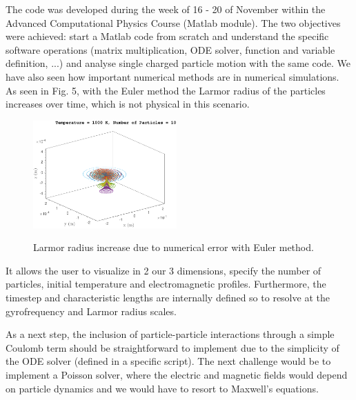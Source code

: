 The code was developed during the week of 16 - 20 of November within the Advanced Computational Physics Course (Matlab module). The two objectives were achieved: start a Matlab code from scratch and understand the specific software operations (matrix multiplication, ODE solver, function and variable definition, ...) and analyse single charged particle motion with the same code. We have also seen how important numerical methods are in numerical simulations. As seen in Fig. 5, with the Euler method the Larmor radius of the particles increases over time, which is not physical in this scenario.

\begin{figure}[h!]
  \centering
    \includegraphics[width=0.49\textwidth]{../Results/Lorentz_xyz_Euler_unifB_E0_10particles.pdf}
    \label{}
      \caption{Larmor radius increase due to numerical error with Euler method.}
\end{figure}

It allows the user to visualize in 2 our 3 dimensions, specify the number of particles, initial temperature and electromagnetic profiles. Furthermore, the timestep and characteristic lengths are internally defined so to resolve at the gyrofrequency and Larmor radius scales.

As a next step, the inclusion of particle-particle interactions through a simple Coulomb term should be straightforward to implement due to the simplicity of the ODE solver (defined in a specific script). The next challenge would be to implement a Poisson solver, where the electric and magnetic fields would depend on particle dynamics and we would have to resort to Maxwell's equations.


